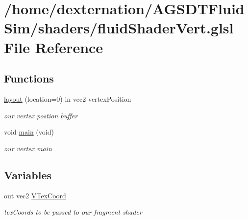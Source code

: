 \hypertarget{fluid_shader_vert_8glsl}{\section{/home/dexternation/\-A\-G\-S\-D\-T\-Fluid\-Sim/shaders/fluid\-Shader\-Vert.glsl File Reference}
\label{fluid_shader_vert_8glsl}
}
\subsection*{Functions}
\begin{DoxyCompactItemize}
\item 
\hyperlink{fluid_shader_vert_8glsl_a76e82f4a2abee8cef9ec3419ca1ad185}{layout} (location=0) in vec2 vertex\-Position
\begin{DoxyCompactList}\small\item\em our vertex postion buffer \end{DoxyCompactList}\item 
\hypertarget{fluid_shader_vert_8glsl_a6288eba0f8e8ad3ab1544ad731eb7667}{void \hyperlink{fluid_shader_vert_8glsl_a6288eba0f8e8ad3ab1544ad731eb7667}{main} (void)}\label{fluid_shader_vert_8glsl_a6288eba0f8e8ad3ab1544ad731eb7667}

\begin{DoxyCompactList}\small\item\em our vertex main \end{DoxyCompactList}\end{DoxyCompactItemize}
\subsection*{Variables}
\begin{DoxyCompactItemize}
\item 
\hypertarget{fluid_shader_vert_8glsl_a849580e4568e3dc8125d8e541b50a483}{out vec2 \hyperlink{fluid_shader_vert_8glsl_a849580e4568e3dc8125d8e541b50a483}{V\-Tex\-Coord}}\label{fluid_shader_vert_8glsl_a849580e4568e3dc8125d8e541b50a483}

\begin{DoxyCompactList}\small\item\em tex\-Coords to be passed to our fragment shader \end{DoxyCompactList}\end{DoxyCompactItemize}


